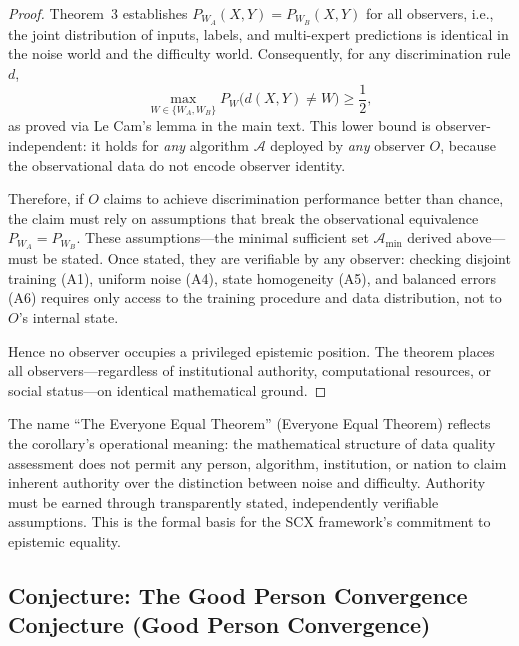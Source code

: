 \begin{proof}
Theorem~3 establishes $P_{W_A}(X,Y) = P_{W_B}(X,Y)$ for all observers,
i.e., the joint distribution of inputs, labels, and multi-expert predictions
is identical in the noise world and the difficulty world. Consequently, for
any discrimination rule $d$,
\[
\max_{W\in\{W_A,W_B\}} P_W\bigl(d(X,Y) \neq W\bigr) \geq \frac{1}{2},
\]
as proved via Le Cam's lemma in the main text. This lower bound is
observer-independent: it holds for \emph{any} algorithm $\mathcal{A}$
deployed by \emph{any} observer $O$, because the observational data do not
encode observer identity.

Therefore, if $O$ claims to achieve discrimination performance better than
chance, the claim must rely on assumptions that break the observational
equivalence $P_{W_A} = P_{W_B}$. These assumptions---the minimal sufficient
set $\mathcal{A}_{\min}$ derived above---must be stated. Once stated, they
are verifiable by any observer: checking disjoint training (A1), uniform
noise (A4), state homogeneity (A5), and balanced errors (A6) requires only
access to the training procedure and data distribution, not to $O$'s
internal state.

Hence no observer occupies a privileged epistemic position. The theorem
places all observers---regardless of institutional authority, computational
resources, or social status---on identical mathematical ground.
\end{proof}

\begin{remark}
The name ``The Everyone Equal Theorem'' (Everyone Equal Theorem) reflects the
corollary's operational meaning: the mathematical structure of data quality
assessment does not permit any person, algorithm, institution, or nation to
claim inherent authority over the distinction between noise and difficulty.
Authority must be earned through transparently stated, independently
verifiable assumptions. This is the formal basis for the SCX framework's
commitment to epistemic equality.
\end{remark}

\subsection{Conjecture: The Good Person Convergence Conjecture (Good Person Convergence)}
\label{sec:good-convergence}

